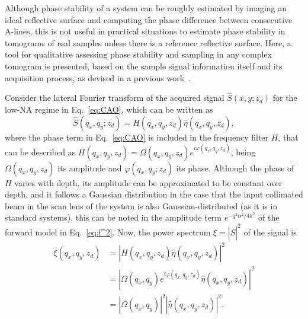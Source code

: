 Although phase stability of a system can be roughly estimated by imaging an ideal reflective surface and computing the phase difference between consecutive A-lines, this is not useful in practical situations to estimate phase stability in tomograms of real samples unless there is a reference reflective surface. Here, a tool for qualitative assessing phase stability and sampling in any complex tomogram is presented, based on the sample signal information itself and its acquisition process, as devised in a previous work~\cite{Cuartas-Velez2017_Formacion}.

Consider the lateral Fourier transform of the acquired signal $\hat{S}(x,y;z_d)$ for the low-NA regime in Eq.~\eqref{eq:CAO}, which can be written as
\begin{equation}
    \hat{S}(q_x, q_y; z_d) = H(q_x, q_y, z_d) \hat{\eta}(q_x, q_y, z_d),
\end{equation}
where the phase term in Eq.~\eqref{eq:CAO} is included in the frequency filter $H$, that can be described as $H(q_x,q_y, z_d)=\Omega(q_x, q_y, z_d)e^{i\varphi(q_x, q_y, z_d)}$, being $\Omega(q_x, q_y, z_d)$ its amplitude and $\varphi(q_x, q_y; z_d)$ its phase. Although the phase of $H$ varies with depth, its amplitude can be approximated to be constant over depth, and it follows a Gaussian distribution in the case that the input collimated beam in the scan lens of the system is also Gaussian-distributed (as it is in standard systems), this can be noted in the amplitude term $e^{-q^2\alpha^2/4k^2}$ of the forward model in Eq.~\eqref{eq:f^2}. Now, the power spectrum $\xi = |\hat{S}|^2$ of the signal is
\begin{align}
    \xi(q_x, q_y, z_d) &= |H(q_x, q_y, z_d) \hat{\eta}( q_x, q_y, z_d)|^2 \nonumber\\
    &= |\Omega(q_x, q_y)e^{i\varphi(q_x, q_y, z_d)} \hat{\eta}(q_x, q_y, z_d)|^2 \nonumber\\
    &= |\Omega(q_x, q_y)|^2 |\hat{\eta}(q_x, q_y, z_d)|^2.
\end{align}

